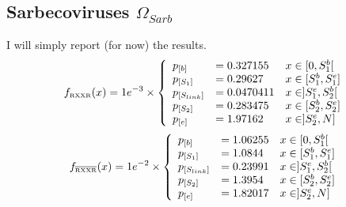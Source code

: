 \documentclass[pdflatex,sn-basic,iicol]{sn-jnl}%
\begin{document}
\subsection{Sarbecoviruses $\Omega_{Sarb}$}
I will simply report (for now) the results.
\[
    f_{\scriptscriptstyle{\text{RXXR}}}(x) = 1e^{-3} \times \left \{  
        \begin{array}{l l l}
            p_{[b]}         & = 0.327155    & x \in [0, S_1^{b}[        \\
            p_{[S_1]}       & = 0.29627     & x \in [S_1^{b}, S_1^{e}]  \\
            p_{[S_{link}]}  & = 0.0470411   & x \in ]S_1^{e}, S_2^{b}[  \\
            p_{[S_2]}       & = 0.283475    & x \in [S_2^{b}, S_2^{e}]   \\
            p_{[e]}         & = 1.97162     & x \in ]S_2^{e}, N]
        \end{array}   \right . 
\]
\[
    f_{\scriptscriptstyle{\overline{\text{RXXR}}}}(x) = 1e^{-2} \times \left \{  
        \begin{array}{l l l}
            p_{[b]}         & = 1.06255     & x \in [0, S_1^{b}[        \\
            p_{[S_1]}       & = 1.0844      & x \in [S_1^{b}, S_1^{e}]  \\
            p_{[S_{link}]}  & = 0.23991     & x \in ]S_1^{e}, S_2^{b}[  \\
            p_{[S_2]}       & = 1.3954      & x \in [S_2^{b}, S_2^{e}]   \\
            p_{[e]}         & = 1.82017     & x \in ]S_2^{e}, N]
        \end{array}   \right . 
\]


\end{document}
